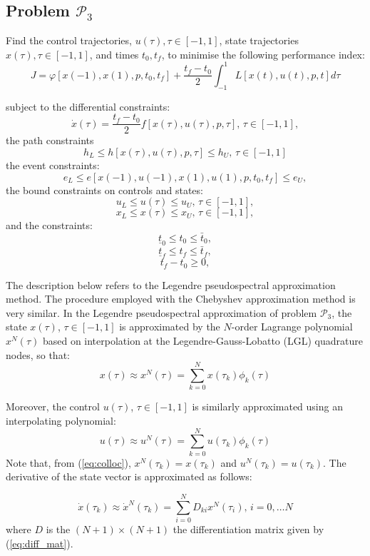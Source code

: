 \documentclass[a4paper,11pt]{report}    %
\begin{document}
\subsection*{Problem $\mathcal{P}_3$} Find the control trajectories, $u(\tau), \tau \in [-1, 1]$, state trajectories $x(\tau), \tau \in [-1, 1]$,  and 
times $t_0, t_f$, to minimise the following performance index:
\[
   J =  \varphi[ x(-1), x(1), p, t_0, t_f ] +\frac{t_f-t_0}{2} \int_{-1}^{1} L[x(t),u(t),p,t] d\tau
\]

\noindent subject to the differential constraints:
\[
 \dot x(\tau) = \frac{t_f-t_0}{2} f[ x(\tau),u(\tau),p,\tau ],  \,\tau \in[-1,1],
\]
the path constraints
\[
 h_L \le h[ x(\tau),u(\tau),p,\tau ] \le h_U,  \,\tau\in[-1,1]
\]
the event constraints:
\[
 e_L \le e[ x(-1),u(-1),x(1),u(1),p,t_0, t_f ] \le e_U, 
\]
the bound constraints on controls and states:
\[
    u_L \le u(\tau) \le u_U, \, \tau \in[-1,1], 
\]
\[
    x_L \le x(\tau) \le x_U, \, \tau \in[-1,1], 
\]
and the constraints:
\[
    \underline{t}_0 \le t_0 \le \bar{t}_0, 
\]
\[
    \underline{t}_f \le t_f \le \bar{t}_f, 
\]
\[
    t_f - t_0 \ge 0, 
\]


The description below refers to  the Legendre pseudospectral approximation method. The procedure employed with the Chebyshev approximation method
is very similar. In the Legendre pseudospectral approximation of problem $\mathcal{P}_3$, the state $x(\tau)$, $\tau \in [-1,1]$ is approximated
by the $N$-order Lagrange polynomial $x^N(\tau)$ based on interpolation at the Legendre-Gauss-Lobatto (LGL) quadrature
nodes, so that:
\begin{equation}
  x(\tau) \approx x^{N}(\tau) = \sum_{k=0}^{N} x(\tau_k) \phi_k(\tau)
\end{equation}

Moreover, the control $u(\tau)$, $\tau \in [-1,1]$ is similarly approximated using an interpolating polynomial:
\begin{equation}
  u(\tau) \approx u^{N}(\tau) = \sum_{k=0}^{N} u(\tau_k) \phi_k(\tau)
\end{equation}
Note that, from (\ref{eq:colloc}), $x^N(\tau_k)=x(\tau_k)$ and $u^N(\tau_k)=u(\tau_k)$.
The derivative of the state vector is approximated as follows:

\begin{equation} \label{eq:xdot_approx}
\dot x(\tau_k) \approx \dot x^N(\tau_k) = \sum \limits_{i=0}^N D_{ki} x^N(\tau_i), \, i=0,\ldots N
\end{equation}
where  $D$ is the $(N+1)\times(N+1)$ the differentiation matrix given by (\ref{eq:diff_mat}).
\end{document}
